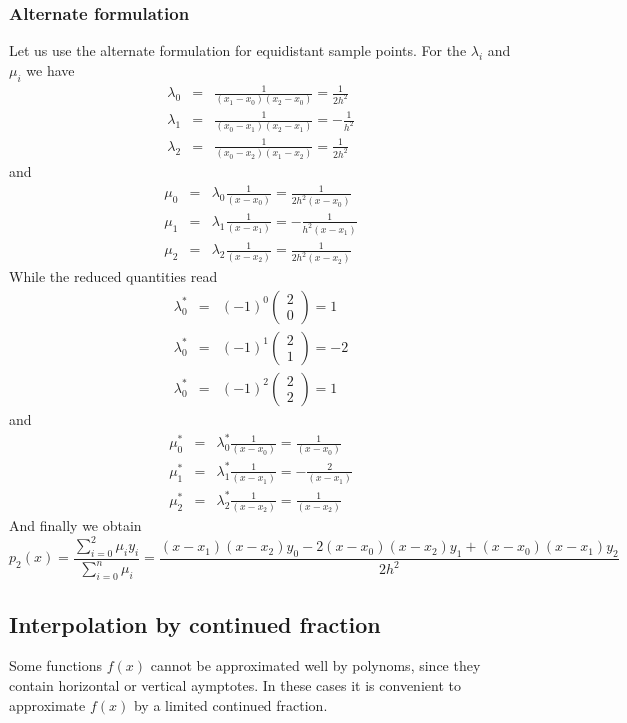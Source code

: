 \subsubsection{Alternate formulation}
Let us use the alternate formulation for equidistant sample points. For
the $\lambda_i$ and $\mu_i$ we have 
\begin{eqnarray*}
\lambda_0&=&\frac{1}{(x_1-x_0)(x_2-x_0)}=\frac{1}{2h^2}\\
\lambda_1&=&\frac{1}{(x_0-x_1)(x_2-x_1)}=-\frac{1}{h^2}\\
\lambda_2&=&\frac{1}{(x_0-x_2)(x_1-x_2)}=\frac{1}{2h^2}
\end{eqnarray*}
and
\begin{eqnarray*}
\mu_0&=&\lambda_0\frac{1}{(x-x_0)}=\frac{1}{2h^2 (x-x_0)}\\
\mu_1&=&\lambda_1\frac{1}{(x-x_1)}=-\frac{1}{h^2 (x-x_1)}\\
\mu_2&=&\lambda_2\frac{1}{(x-x_2)}=\frac{1}{2h^2 (x-x_2)}
\end{eqnarray*}
While the reduced quantities read
\begin{eqnarray*}
\lambda^*_0&=&(-1)^0\left(\begin{array}{c}2 \\ 0\end{array}\right)=1\\
\lambda^*_0&=&(-1)^1\left(\begin{array}{c}2 \\ 1\end{array}\right)=-2\\
\lambda^*_0&=&(-1)^2\left(\begin{array}{c}2 \\ 2\end{array}\right)=1
\end{eqnarray*}
and
\begin{eqnarray*}
\mu_0^*&=&\lambda_0^*\frac{1}{(x-x_0)}=\frac{1}{(x-x_0)}\\
\mu_1^*&=&\lambda_1^*\frac{1}{(x-x_1)}=-\frac{2}{(x-x_1)}\\
\mu_2^*&=&\lambda_2^*\frac{1}{(x-x_2)}=\frac{1}{(x-x_2)}
\end{eqnarray*}
And finally we obtain
\[
p_2(x)=\frac{\displaystyle\sum_{i=0}^2 \mu_iy_i}{\displaystyle\sum_{i=0}^n \mu_i}
=\frac{(x-x_1) (x-x_2) y_0 -2(x-x_0) (x-x_2) y_1+ (x-x_0) (x-x_1) y_2}{2h^2}
\]
\subsection{Interpolation by continued fraction}
Some functions $f(x)$ cannot be approximated well by polynoms, since they
contain horizontal or vertical aymptotes. In these cases it is convenient to
approximate $f(x)$ by a limited continued fraction.

